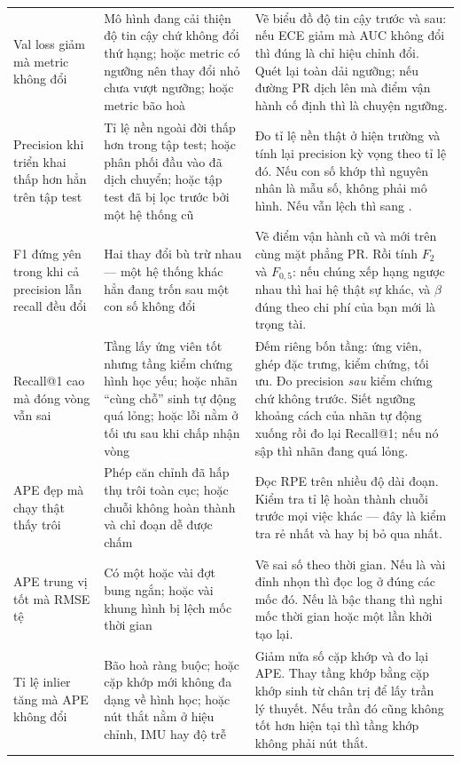 \documentclass[../../deep_learning.tex]{subfiles}
\begin{document}
\begin{longtable}{@{}L{3.35cm}L{5.55cm}L{6.3cm}@{}}
Val loss giảm mà metric không đổi
& Mô hình đang cải thiện độ tin cậy chứ không đổi thứ hạng; hoặc metric có ngưỡng nên thay đổi nhỏ chưa vượt ngưỡng; hoặc metric bão hoà
& Vẽ biểu đồ độ tin cậy trước và sau: nếu ECE giảm mà AUC không đổi thì đúng là chỉ hiệu chỉnh đổi. Quét lại toàn dải ngưỡng; nếu đường PR dịch lên mà điểm vận hành cố định thì là chuyện ngưỡng.\\
Precision khi triển khai thấp hơn hẳn trên tập test
& Tỉ lệ nền ngoài đời thấp hơn trong tập test; hoặc phân phối đầu vào đã dịch chuyển; hoặc tập test đã bị lọc trước bởi một hệ thống cũ
& Đo tỉ lệ nền thật ở hiện trường và tính lại precision kỳ vọng theo tỉ lệ đó. Nếu con số khớp thì nguyên nhân là mẫu số, không phải mô hình. Nếu vẫn lệch thì sang .\\
F1 đứng yên trong khi cả precision lẫn recall đều đổi
& Hai thay đổi bù trừ nhau --- một hệ thống khác hẳn đang trốn sau một con số không đổi
& Vẽ điểm vận hành cũ và mới trên cùng mặt phẳng PR. Rồi tính \(F_2\) và \(F_{0{,}5}\): nếu chúng xếp hạng ngược nhau thì hai hệ thật sự khác, và \(\beta\) đúng theo chi phí của bạn mới là trọng tài.\\
Recall@1 cao mà đóng vòng vẫn sai
& Tầng lấy ứng viên tốt nhưng tầng kiểm chứng hình học yếu; hoặc nhãn ``cùng chỗ'' sinh tự động quá lỏng; hoặc lỗi nằm ở tối ưu sau khi chấp nhận vòng
& Đếm riêng bốn tầng: ứng viên, ghép đặc trưng, kiểm chứng, tối ưu. Đo precision \emph{sau} kiểm chứng chứ không trước. Siết ngưỡng khoảng cách của nhãn tự động xuống rồi đo lại Recall@1; nếu nó sập thì nhãn đang quá lỏng.\\
APE đẹp mà chạy thật thấy trôi
& Phép căn chỉnh đã hấp thụ trôi toàn cục; hoặc chuỗi không hoàn thành và chỉ đoạn dễ được chấm
& Đọc RPE trên nhiều độ dài đoạn. Kiểm tra tỉ lệ hoàn thành chuỗi trước mọi việc khác --- đây là kiểm tra rẻ nhất và hay bị bỏ qua nhất.\\
APE trung vị tốt mà RMSE tệ
& Có một hoặc vài đợt bung ngắn; hoặc vài khung hình bị lệch mốc thời gian
& Vẽ sai số theo thời gian. Nếu là vài đỉnh nhọn thì đọc log ở đúng các mốc đó. Nếu là bậc thang thì nghi mốc thời gian hoặc một lần khởi tạo lại.\\
Tỉ lệ inlier tăng mà APE không đổi
& Bão hoà ràng buộc; hoặc cặp khớp mới không đa dạng về hình học; hoặc nút thắt nằm ở hiệu chỉnh, IMU hay độ trễ
& Giảm nửa số cặp khớp và đo lại APE. Thay tầng khớp bằng cặp khớp sinh từ chân trị để lấy trần lý thuyết. Nếu trần đó cũng không tốt hơn hiện tại thì tầng khớp không phải nút thắt.\\

\end{longtable}
\end{document}
